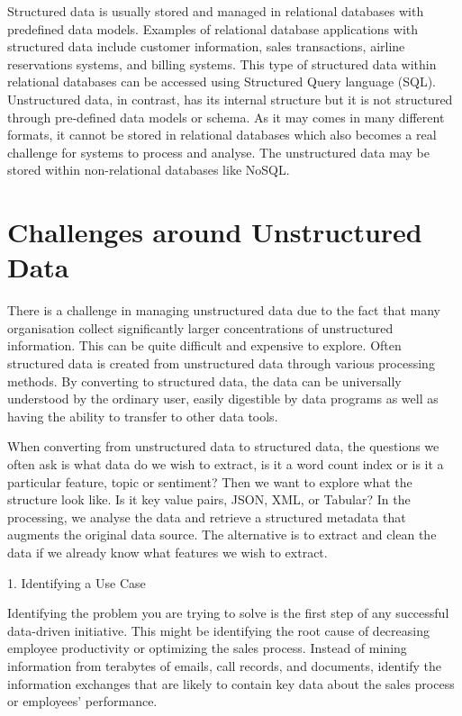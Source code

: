 \documentclass[11pt]{book}
\begin{document}
Structured data is usually stored and managed in relational databases with predefined data models. Examples of relational database applications with structured data include customer information, sales transactions, airline reservations systems, and billing systems. This type of structured data within relational databases can be accessed using Structured Query language (SQL).\\
 
Unstructured data, in contrast, has its internal structure but it is not structured through pre-defined data models or schema. As it may comes in many different formats, it cannot be stored in relational databases which also becomes a real challenge for systems to process and analyse. The unstructured data may be stored within non-relational databases like NoSQL.

\section{Challenges around Unstructured Data}
 
There is a challenge in managing unstructured data due to the fact that many organisation collect significantly larger concentrations of unstructured information. This can be quite difficult and expensive to explore. Often structured data is created from unstructured data through various processing methods. By converting to structured data, the data can be universally understood by the ordinary user, easily digestible by data programs as well as having the ability to transfer to other data tools.

When converting from unstructured data to structured data, the questions we often ask is what data do we wish to extract, is it a word count index or is it a particular feature, topic or sentiment? Then we want to explore what the structure look like. Is it key value pairs, JSON, XML, or Tabular? In the processing, we analyse the data and retrieve a structured metadata that augments the original data source. The alternative is to extract and clean the data if we already know what features we wish to extract. 

1.     Identifying a Use Case

Identifying the problem you are trying to solve is the first step of any successful data-driven initiative. This might be identifying the root cause of decreasing employee productivity or optimizing the sales process. Instead of mining information from terabytes of emails, call records, and documents, identify the information exchanges that are likely to contain key data about the sales process or employees’ performance.
\end{document}

